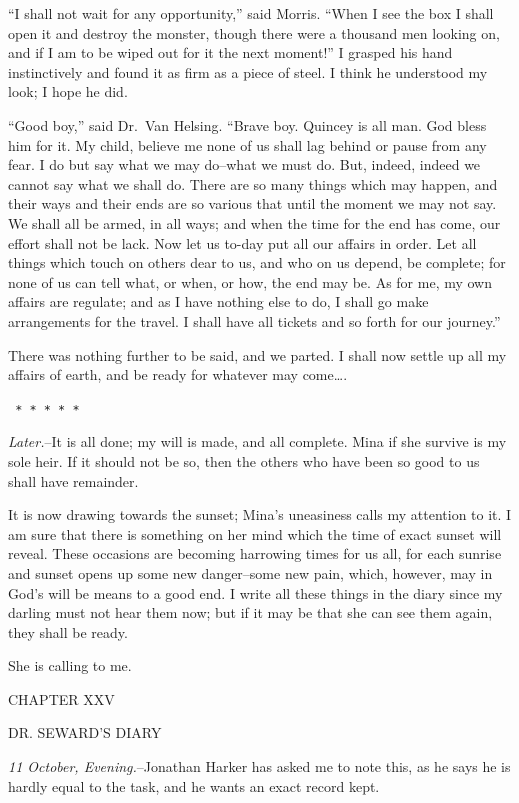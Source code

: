 \documentclass[12pt,openright]{book}
\begin{document}
“I shall not wait for any opportunity,” said Morris. “When I see the box I shall open it and destroy the monster, though there were a thousand men looking on, and if I am to be wiped out for it the next moment!” I grasped his hand instinctively and found it as firm as a piece of steel. I think he understood my look; I hope he did.

“Good boy,” said Dr. Van Helsing. “Brave boy. Quincey is all man. God bless him for it. My child, believe me none of us shall lag behind or pause from any fear. I do but say what we may do–what we must do. But, indeed, indeed we cannot say what we shall do. There are so many things which may happen, and their ways and their ends are so various that until the moment we may not say. We shall all be armed, in all ways; and when the time for the end has come, our effort shall not be lack. Now let us to-day put all our affairs in order. Let all things which touch on others dear to us, and who on us depend, be complete; for none of us can tell what, or when, or how, the end may be. As for me, my own affairs are regulate; and as I have nothing else to do, I shall go make arrangements for the travel. I shall have all tickets and so forth for our journey.”

There was nothing further to be said, and we parted. I shall now settle up all my affairs of earth, and be ready for whatever may come….

\texttt{   *       *       *       *       *}

\textit{Later.}–It is all done; my will is made, and all complete. Mina if she survive is my sole heir. If it should not be so, then the others who have been so good to us shall have remainder.

It is now drawing towards the sunset; Mina’s uneasiness calls my attention to it. I am sure that there is something on her mind which the time of exact sunset will reveal. These occasions are becoming harrowing times for us all, for each sunrise and sunset opens up some new danger–some new pain, which, however, may in God’s will be means to a good end. I write all these things in the diary since my darling must not hear them now; but if it may be that she can see them again, they shall be ready.

She is calling to me.

CHAPTER XXV

DR. SEWARD’S DIARY

\textit{11 October, Evening.}–Jonathan Harker has asked me to note this, as he says he is hardly equal to the task, and he wants an exact record kept.
\end{document}
